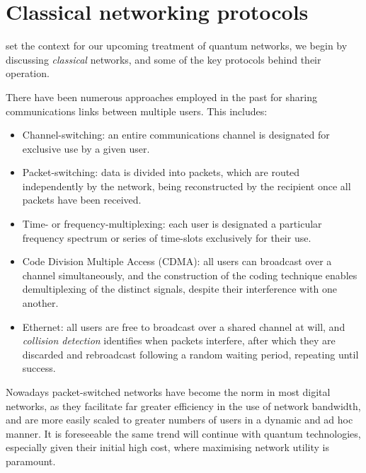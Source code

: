 %
%

\section{Classical networking protocols} \label{sec:classical_nets} 

 set the context for our upcoming treatment of quantum networks, we begin by discussing \textit{classical} networks, and some of the key protocols behind their operation.

There have been numerous approaches employed in the past for sharing communications links between multiple users. This includes:
\begin{itemize}
	\item Channel-switching: an entire communications channel is designated for exclusive use by a given user. 
	\item Packet-switching: data is divided into packets, which are routed independently by the network, being reconstructed by the recipient once all packets have been received.
	\item Time- or frequency-multiplexing: each user is designated a particular frequency spectrum or series of time-slots exclusively for their use. 
	\item Code Division Multiple Access (CDMA): all users can broadcast over a channel simultaneously, and the construction of the coding technique enables demultiplexing of the distinct signals, despite their interference with one another.
	\item Ethernet: all users are free to broadcast over a shared channel at will, and \textit{collision detection} identifies when packets interfere, after which they are discarded and rebroadcast following a random waiting period, repeating until success.
\end{itemize}

Nowadays packet-switched networks have become the norm in most digital networks, as they facilitate far greater efficiency in the use of network bandwidth, and are more easily scaled to greater numbers of users in a dynamic and ad hoc manner. It is foreseeable the same trend will continue with quantum technologies, especially given their initial high cost, where maximising network utility is paramount.

